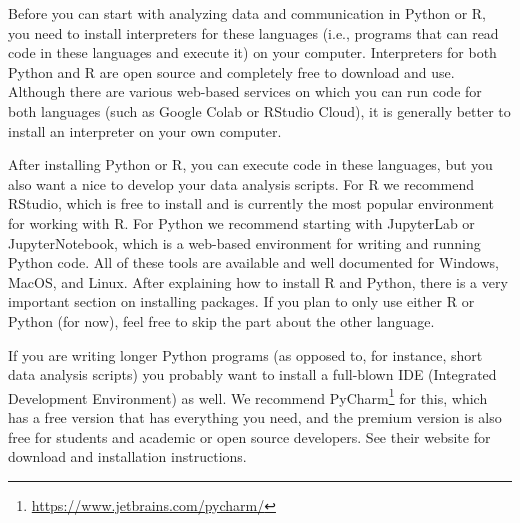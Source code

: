 Before you can start with analyzing data and communication in Python or R,
you need to install interpreters for these languages (i.e., programs that can read code in these languages and execute it) on your computer.
Interpreters for both Python and R are open source and completely free to download and use.
Although there are various web-based services on which you can run code for both languages
(such as Google Colab or RStudio Cloud),
it is generally better to install an interpreter on your own computer.

After installing Python or R, you can execute code in these languages, but you also want a nice
 to develop your data analysis scripts. 
For R we recommend RStudio, which is free to install and is currently the most popular environment for working with R.
For Python we recommend starting with JupyterLab or JupyterNotebook, which is a web-based environment for writing and running Python code.
All of these tools are available and well documented for Windows, MacOS, and Linux. 
After explaining how to install R and Python, there is a very important section on installing packages.
If you plan to only use either R or Python (for now), feel free to skip the part about the other language.

If you are writing longer Python programs (as opposed to, for instance, short data analysis scripts) you probably want to install a full-blown IDE (Integrated Development Environment) as well.
We recommend PyCharm\footnote{\url{https://www.jetbrains.com/pycharm/}} for this, which has a free version that has everything you need, and the premium version is also free for students and academic or open source developers.
See their website for download and installation instructions.


